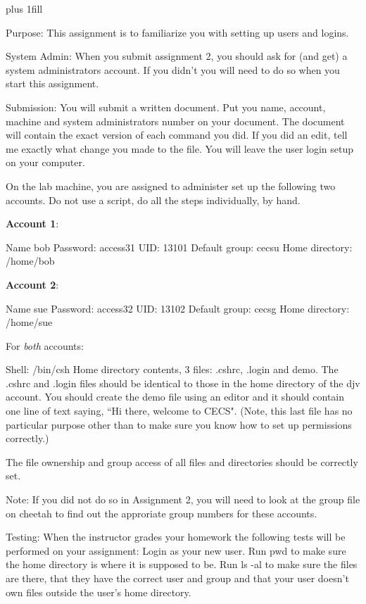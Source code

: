
\rightskip=0pt plus 1fill

\parindent 0pt

Purpose: This assignment is to familiarize you with setting up users and logins.

System Admin: When you submit assignment 2, you should ask for (and get)
a system administrators account. If you didn't you will need to do so
when you start this assignment.

Submission: You will submit a written document.
Put you name, account, machine and system administrators number on your 
document.
The document will contain the exact version of each command you did.
If you did an edit, tell me exactly what change you made to the file. 
You will leave the user login setup on your computer.

On the lab machine, you are assigned to administer set up the
following two accounts.
Do not use a script, do all the steps individually, by hand.

{\bf Account 1}:

Name {\ltt{}bob}
\break
Password: access31
\break
UID: {\ltt{}13101}
\break
Default group: {\ltt{}cecsu}
\break
Home directory: {\ltt{}/home/bob}

{\bf Account 2}:

Name {\ltt{}sue}
\break
Password: access32
\break
UID: {\ltt{}13102}
\break
Default group: {\ltt{}cecsg}
\break
Home directory: {\ltt{}/home/sue}

For {\it both} accounts:

Shell: {\ltt{}/bin/csh}
\break
Home directory contents, 3 files:
{\ltt{}.cshrc}, {\ltt{}.login} and {\ltt{}demo}.
\break
The {\ltt{}.cshrc} and {\ltt{}.login} files should be identical to those in
the home directory of the {\ltt{}djv} account.
You should create the {\ltt{}demo} file using an editor
and it should contain one line of text saying,
``Hi there, welcome to CECS". 
(Note, this last file has no particular purpose other than
to make sure you know how to set up permissions correctly.)

The file ownership and group access of all files and directories
should be correctly set.

Note:
If you did not do so in Assignment 2,
you will need to look at the group file on cheetah to find out
the approriate group numbers for these accounts.

Testing:
\break
When the instructor grades your homework the following tests will be
performed on your assignment:
Login as your new user. Run {\ltt{}pwd} to make sure the home directory
is where it is supposed to be.
Run {\ltt{}ls -al} to make sure the files are there, that they have
the correct user and group and that your user doesn't own files
outside the user's home directory.
\bye
